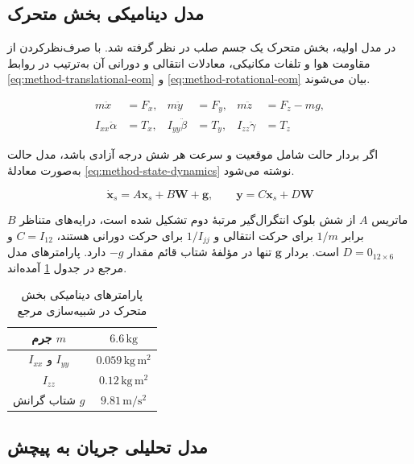 \subsection{مدل دینامیکی بخش متحرک}
\label{subsec:method-mover-model}

در مدل اولیه، بخش متحرک یک جسم صلب در نظر گرفته شد. با صرف‌نظرکردن از مقاومت هوا و تلفات مکانیکی، معادلات انتقالی و دورانی آن به‌ترتیب در روابط \ref{eq:method-translational-eom} و \ref{eq:method-rotational-eom} بیان می‌شوند.

\begin{align}
	m\ddot{x}&=F_x, & m\ddot{y}&=F_y, & m\ddot{z}&=F_z-mg,\label{eq:method-translational-eom}\\
	I_{xx}\ddot{\alpha}&=T_x, & I_{yy}\ddot{\beta}&=T_y, & I_{zz}\ddot{\gamma}&=T_z
	\label{eq:method-rotational-eom}
\end{align}

اگر بردار حالت شامل موقعیت و سرعت هر شش درجه آزادی باشد، مدل حالت به‌صورت معادلهٔ \ref{eq:method-state-dynamics} نوشته می‌شود.

\begin{equation}
	\dot{\mathbf x}_s=A\mathbf x_s+B\mathbf W+\mathbf g,
	\qquad
	\mathbf y=C\mathbf x_s+D\mathbf W
	\label{eq:method-state-dynamics}
\end{equation}

ماتریس $A$ از شش بلوک انتگرال‌گیر مرتبهٔ دوم تشکیل شده است، درایه‌های متناظر $B$ برابر $1/m$ برای حرکت انتقالی و $1/I_{jj}$ برای حرکت دورانی هستند، $C=I_{12}$ و $D=0_{12\times6}$ است. بردار $\mathbf g$ تنها در مؤلفهٔ شتاب قائم مقدار $-g$ دارد. پارامترهای مدل مرجع در جدول \ref{tab:method-reference-dynamics} آمده‌اند.

\begin{table}[!htbp]
	\centering
	\caption{پارامترهای دینامیکی بخش متحرک در شبیه‌سازی مرجع}
	\label{tab:method-reference-dynamics}
	\begin{tabular}{|c|c|}
		\hline
		جرم $m$ & $6.6\,\mathrm{kg}$\\ \hline
		$I_{xx}$ و $I_{yy}$ & $0.059\,\mathrm{kg\,m^2}$\\ \hline
		$I_{zz}$ & $0.12\,\mathrm{kg\,m^2}$\\ \hline
		شتاب گرانش $g$ & $9.81\,\mathrm{m/s^2}$\\ \hline
	\end{tabular}
\end{table}

\subsection{مدل تحلیلی جریان به پیچش}
\label{subsec:method-stator-model}

